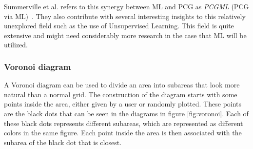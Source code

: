Summerville et al. refers to this synergy between ML and PCG as \textit{PCGML} (PCG via ML)~\cite{lmao_ml}.
They also contribute with several interesting insights to this relatively unexplored field such as the use of Unsupervised Learning.
This field is quite extensive and might need considerably more research in the case that ML will be utilized.

\subsubsection{Voronoi diagram}
A Voronoi diagram can be used to divide an area into subareas that look more natural than a normal grid. 
The construction of the diagram starts with some points inside the area, either given by a user or randomly plotted. 
These points are the black dots that can be seen in the diagrams in figure \ref{fig:voronoi}.
Each of these black dots represents different subareas, which are represented as different colors in the same figure.
Each point inside the area is then associated with the subarea of the black dot that is closest.

